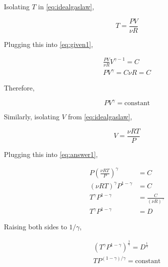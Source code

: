 \documentclass[9pt,a4paper,twocolumn]{article}
\begin{document}
Isolating $T$ in \eqref{eq:idealgaslaw},

\begin{equation}
	T = \frac{PV}{\nu R} \label{eq:idealgastemp}
\end{equation}

Plugging this into \eqref{eq:given1},

\begin{align}
	\frac{PV}{\nu R} V^{\gamma - 1} = C \nonumber \\
	PV^{\gamma} = C\nu R = C
\end{align}

Therefore,

\begin{equation}\label{eq:answer1}
\boxed{	PV^\gamma = \textrm{constant}}
\end{equation}

Similarly, isolating $V$ from \eqref{eq:idealgaslaw},

\begin{equation}\label{eq:idealgasvol}
	V = \frac{\nu RT}{P}
\end{equation}

Plugging this into \eqref{eq:answer1},

\begin{align}
	P\left( \frac{\nu RT}{P} \right)^\gamma & = C \nonumber \\
	\left( \nu RT \right)^\gamma P^{1-\gamma} & = C \nonumber \\
	T^\gamma P^{1-\gamma} & = \frac{C}{\left( \nu R \right)^\gamma} \nonumber \\
	T^\gamma P^{1-\gamma} & = D
\end{align}

Raising both sides to $1/\gamma$,

\begin{eqnarray}
	\left( T^\gamma P^{1-\gamma} \right)^{\frac{1}{\gamma}} = D^{\frac{1}{\gamma}} \nonumber \\
\boxed{	TP^{(1 - \gamma)/\gamma} = \textrm{constant}} \label{eq:answer2}
\end{eqnarray}
\end{document}
